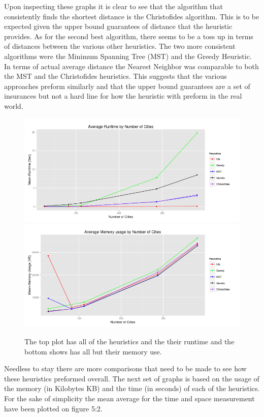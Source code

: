 \documentclass[midd]{thesis}
\newcommand{\tab}{\hspace*{2em}}
\begin{document}
\tab Upon inspecting these graphs it is clear to see that the algorithm that consistently finds the shortest distance is the Christofides algorithm. This is to be expected given the upper bound guarantees of distance that the heuristic provides. As for the second best algorithm, there seems to be a toss up in terms of distances between the various other heuristics. The two more consistent algorithms were the Minimum Spanning Tree (MST) and the Greedy Heuristic. In terms of actual average distance the Nearest Neighbor was comparable to both the MST and the Christofides heuristics. This suggests that the various approaches preform similarly and that the upper bound guarantees are a set of insurances but not a hard line for how the heuristic with preform in the real world. \\
\begin{figure}[t!]
	\begin{center}
	\caption{The top plot has all of the heuristics and the their runtime  and the bottom shows has all but their memory use.}
	\includegraphics[width=.95\textwidth]{time_numcities}
	\includegraphics[width=.95\textwidth]{mem_numcities}
	\end{center}
\end{figure}
\tab Needless to stay there are more comparisons that need to be made to see how these heuristics preformed overall. The next set of graphs is based on the usage of the memory (in Kilobytes KB) and the time (in seconds) of each of the heuristics. For the sake of simplicity the mean average for the time and space measurement have been plotted on figure 5:2.\\
\end{document}
